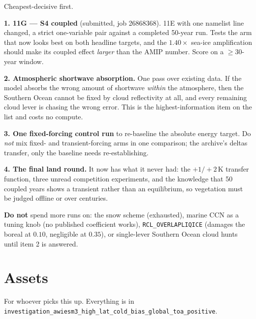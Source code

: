 \documentclass[10pt]{article}
\begin{document}
Cheapest-decisive first.

\textbf{1. 11G --- S4 coupled} (submitted, job 26868368). 11E with one namelist line
changed, a strict one-variable pair against a completed 50-year run. Tests the arm that
now looks best on both headline targets, and the $1.40\times$ sea-ice amplification should
make its coupled effect \emph{larger} than the AMIP number. Score on a $\geq$30-year window.

\textbf{2. Atmospheric shortwave absorption.} One pass over existing data. If the model
absorbs the wrong amount of shortwave \emph{within} the atmosphere, then the Southern Ocean
cannot be fixed by cloud reflectivity at all, and every remaining cloud lever is chasing
the wrong error. This is the highest-information item on the list and costs no compute.

\textbf{3. One fixed-forcing control run} to re-baseline the absolute energy target.
Do \emph{not} mix fixed- and transient-forcing arms in one comparison; the archive's deltas
transfer, only the baseline needs re-establishing.

\textbf{4. The final land round.} It now has what it never had: the $+1/+2$\,K transfer
function, three unread competition experiments, and the knowledge that 50 coupled years
shows a transient rather than an equilibrium, so vegetation must be judged offline or over
centuries.

\textbf{Do not} spend more runs on: the snow scheme (exhausted), marine CCN as a tuning
knob (no published coefficient works), \texttt{RCL\_OVERLAPLIQICE} (damages the boreal at
$0.10$, negligible at $0.35$), or single-lever Southern Ocean cloud hunts until item 2 is
answered.

\section{Assets}\label{sec:assets}

For whoever picks this up. Everything is in
\texttt{investigation\_awiesm3\_high\_lat\_cold\_bias\_global\_toa\_positive}.
\end{document}
